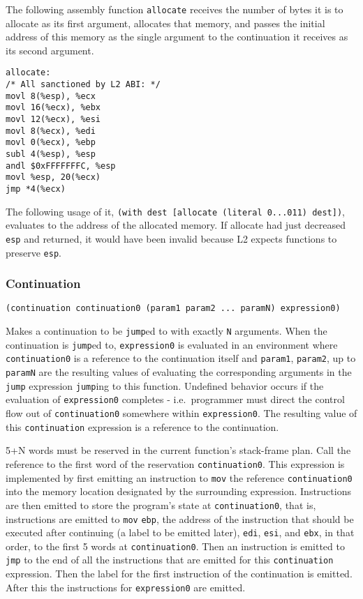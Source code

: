 \documentclass[]{article}
\begin{document}
The following assembly function \texttt{allocate} receives the number of
bytes it is to allocate as its first argument, allocates that memory,
and passes the initial address of this memory as the single argument to
the continuation it receives as its second argument.

\begin{verbatim}
allocate:
/* All sanctioned by L2 ABI: */
movl 8(%esp), %ecx
movl 16(%ecx), %ebx
movl 12(%ecx), %esi
movl 8(%ecx), %edi
movl 0(%ecx), %ebp
subl 4(%esp), %esp
andl $0xFFFFFFFC, %esp
movl %esp, 20(%ecx)
jmp *4(%ecx)
\end{verbatim}

The following usage of it,
\texttt{(with\ dest\ {[}allocate\ (literal\ 0...011)\ dest{]})},
evaluates to the address of the allocated memory. If allocate had just
decreased \texttt{esp} and returned, it would have been invalid because
L2 expects functions to preserve \texttt{esp}.

\hypertarget{continuation}{\subsubsection{Continuation}\label{continuation}}

\begin{verbatim}
(continuation continuation0 (param1 param2 ... paramN) expression0)
\end{verbatim}

Makes a continuation to be \texttt{jump}ed to with exactly \texttt{N}
arguments. When the continuation is \texttt{jump}ed to,
\texttt{expression0} is evaluated in an environment where
\texttt{continuation0} is a reference to the continuation itself and
\texttt{param1}, \texttt{param2}, up to \texttt{paramN} are the
resulting values of evaluating the corresponding arguments in the
\texttt{jump} expression \texttt{jump}ing to this function. Undefined
behavior occurs if the evaluation of \texttt{expression0} completes -
i.e.~programmer must direct the control flow out of
\texttt{continuation0} somewhere within \texttt{expression0}. The
resulting value of this \texttt{continuation} expression is a reference
to the continuation.

5+N words must be reserved in the current function's stack-frame plan.
Call the reference to the first word of the reservation
\texttt{continuation0}. This expression is implemented by first emitting
an instruction to \texttt{mov} the reference \texttt{continuation0} into
the memory location designated by the surrounding expression.
Instructions are then emitted to store the program's state at
\texttt{continuation0}, that is, instructions are emitted to
\texttt{mov} \texttt{ebp}, the address of the instruction that should be
executed after continuing (a label to be emitted later), \texttt{edi},
\texttt{esi}, and \texttt{ebx}, in that order, to the first 5 words at
\texttt{continuation0}. Then an instruction is emitted to \texttt{jmp}
to the end of all the instructions that are emitted for this
\texttt{continuation} expression. Then the label for the first
instruction of the continuation is emitted. After this the instructions
for \texttt{expression0} are emitted.
\end{document}
